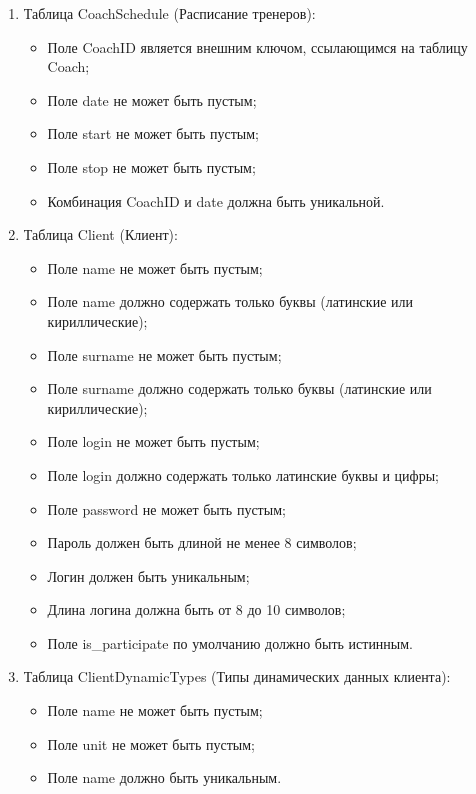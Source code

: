 \begin{enumerate}
    \item Таблица CoachSchedule (Расписание тренеров):
    \begin{itemize}
        \item[---] Поле CoachID является внешним ключом, ссылающимся на таблицу Coach;
        \item[---] Поле date не может быть пустым;
        \item[---] Поле start не может быть пустым;
        \item[---] Поле stop не может быть пустым;
        \item[---] Комбинация CoachID и date должна быть уникальной.
    \end{itemize}

    \item Таблица Client (Клиент):
    \begin{itemize}
        \item[---] Поле name не может быть пустым;
        \item[---] Поле name должно содержать только буквы (латинские или кириллические);
        \item[---] Поле surname не может быть пустым;
        \item[---] Поле surname должно содержать только буквы (латинские или кириллические);
        \item[---] Поле login не может быть пустым;
        \item[---] Поле login должно содержать только латинские буквы и цифры;
        \item[---] Поле password не может быть пустым;
        \item[---] Пароль должен быть длиной не менее 8 символов;
        \item[---] Логин должен быть уникальным;
        \item[---] Длина логина должна быть от 8 до 10 символов;
        \item[---] Поле is\_participate по умолчанию должно быть истинным.
    \end{itemize}

    \item Таблица ClientDynamicTypes (Типы динамических данных клиента):
    \begin{itemize}
        \item[---] Поле name не может быть пустым;
        \item[---] Поле unit не может быть пустым;
        \item[---] Поле name должно быть уникальным.
    \end{itemize}


\end{enumerate}

